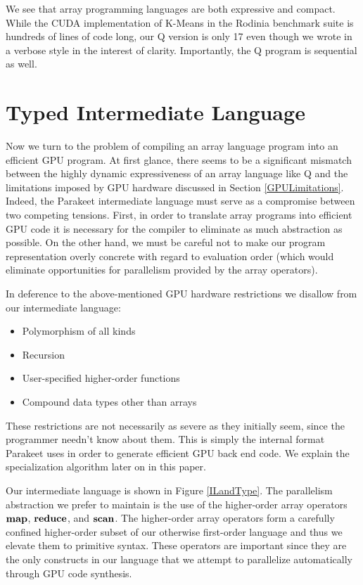 \documentclass[preprint]{sigplanconf}
\begin{document}
We see that array programming languages are both expressive and compact.  While the CUDA implementation of K-Means in the Rodinia benchmark suite is hundreds of lines of code long, our Q version is only 17 even though we wrote in a verbose style in the interest of clarity. Importantly, the Q program is sequential as well.

\section{Typed Intermediate Language}
Now we turn to the problem of compiling an array language program into an efficient GPU program. At first glance, there seems to be a significant mismatch between the highly dynamic expressiveness of an array language like Q and the limitations imposed by GPU hardware discussed in Section \ref{GPULimitations}. Indeed, the Parakeet intermediate language must serve as a compromise between two competing tensions. First, in order to translate array programs into efficient GPU code it is necessary for the compiler to eliminate as much abstraction as possible. On the other hand, we must be careful not to make our program representation overly concrete with regard to evaluation order (which would eliminate opportunities for parallelism provided by the array operators).

In deference to the above-mentioned GPU hardware restrictions we disallow from our intermediate language:

\begin{itemize}
\item Polymorphism of all kinds
\item Recursion
\item User-specified higher-order functions
\item Compound data types other than arrays
\end{itemize}

These restrictions are not necessarily as severe as they initially seem, since the programmer needn't know about them. This is simply the internal format Parakeet uses in order to generate efficient GPU back end code. We explain the specialization algorithm later on in this paper.

Our intermediate language is shown in Figure \ref{ILandType}. The parallelism abstraction we prefer to maintain is the use of the higher-order array operators $\mbox{\textbf{map}}$, $\mbox{\textbf{reduce}}$, and $\mbox{\textbf{scan}}$. The higher-order array operators form a carefully confined higher-order subset of our otherwise first-order language and thus we elevate them to primitive syntax. These operators are important since they are the only constructs in our language that we attempt to parallelize automatically through GPU code synthesis.
\end{document}
